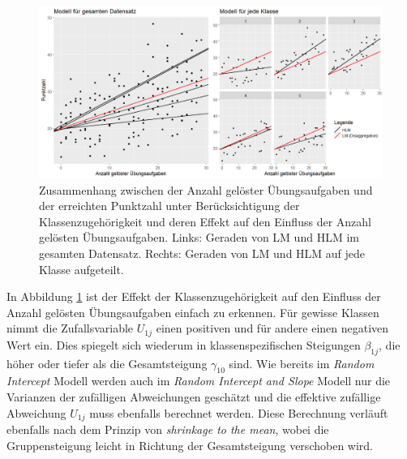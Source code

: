 \documentclass[12pt, a4paper]{article}\usepackage[]{graphicx}\usepackage[]{color}
\begin{document}
\begin{figure}[t!]
\centering
\includegraphics[width = \textwidth]{./figures/random_intercept_slope}
\caption{Zusammenhang zwischen der Anzahl gelöster Übungsaufgaben und der erreichten Punktzahl unter Berücksichtigung der Klassenzugehörigkeit und deren Effekt auf den Einfluss der Anzahl gelösten Übungsaufgaben. Links: Geraden von LM und HLM im gesamten Datensatz. Rechts: Geraden von LM und HLM auf jede Klasse aufgeteilt.}
\label{fig:random_intercept_slope}
\end{figure}

In Abbildung \ref{fig:random_intercept_slope} ist der Effekt der Klassenzugehörigkeit auf den Einfluss der Anzahl gelösten Übungsaufgaben einfach zu erkennen. Für gewisse Klassen nimmt die Zufallsvariable $U_{1j}$ einen positiven und für andere einen negativen Wert ein. Dies spiegelt sich wiederum in klassenspezifischen Steigungen $\beta_{1j}$, die höher oder tiefer als die Gesamtsteigung $\gamma_{10}$ sind. Wie bereits im \textit{Random Intercept} Modell werden auch im \textit{Random Intercept and Slope} Modell nur die Varianzen der zufälligen Abweichungen geschätzt und die effektive zufällige Abweichung $U_{1j}$ muss ebenfalls berechnet werden. Diese Berechnung verläuft ebenfalls nach dem Prinzip von \textit{shrinkage to the mean}, wobei die Gruppensteigung leicht in Richtung der Gesamtsteigung verschoben wird.
\end{document}
